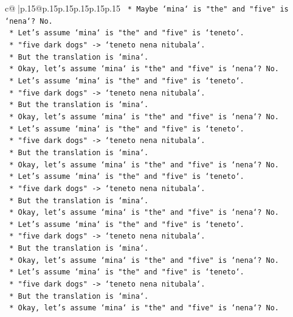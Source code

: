 \documentclass{article}
\begin{document}
{\begin{supertabular}{c@{$\;$}|p{.15\linewidth}@{}p{.15\linewidth}p{.15\linewidth}p{.15\linewidth}p{.15\linewidth}p{.15\linewidth}}
{{{\texttt{    *   Maybe `mina` is "the" and "five" is `nena`? No.} \\
\texttt{    *   Let's assume `mina` is "the" and "five" is `teneto`.} \\
\texttt{    *   "five dark dogs" {-}> `teneto nena nitubala`.} \\
\texttt{    *   But the translation is `mina`.} \\
\texttt{    *   Okay, let's assume `mina` is "the" and "five" is `nena`? No.} \\
\texttt{    *   Let's assume `mina` is "the" and "five" is `teneto`.} \\
\texttt{    *   "five dark dogs" {-}> `teneto nena nitubala`.} \\
\texttt{    *   But the translation is `mina`.} \\
\texttt{    *   Okay, let's assume `mina` is "the" and "five" is `nena`? No.} \\
\texttt{    *   Let's assume `mina` is "the" and "five" is `teneto`.} \\
\texttt{    *   "five dark dogs" {-}> `teneto nena nitubala`.} \\
\texttt{    *   But the translation is `mina`.} \\
\texttt{    *   Okay, let's assume `mina` is "the" and "five" is `nena`? No.} \\
\texttt{    *   Let's assume `mina` is "the" and "five" is `teneto`.} \\
\texttt{    *   "five dark dogs" {-}> `teneto nena nitubala`.} \\
\texttt{    *   But the translation is `mina`.} \\
\texttt{    *   Okay, let's assume `mina` is "the" and "five" is `nena`? No.} \\
\texttt{    *   Let's assume `mina` is "the" and "five" is `teneto`.} \\
\texttt{    *   "five dark dogs" {-}> `teneto nena nitubala`.} \\
\texttt{    *   But the translation is `mina`.} \\
\texttt{    *   Okay, let's assume `mina` is "the" and "five" is `nena`? No.} \\
\texttt{    *   Let's assume `mina` is "the" and "five" is `teneto`.} \\
\texttt{    *   "five dark dogs" {-}> `teneto nena nitubala`.} \\
\texttt{    *   But the translation is `mina`.} \\
\texttt{    *   Okay, let's assume `mina` is "the" and "five" is `nena`? No.} \\
}}}
\end{supertabular}}
\end{document}
